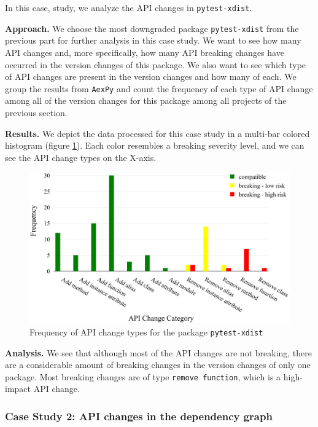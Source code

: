 \documentclass[conference]{IEEEtran}
\begin{document}
In this case, study, we analyze the API changes in \texttt{pytest-xdist}.

\textbf{Approach.} We choose the most downgraded package \texttt{pytest-xdist} from the previous part for further analysis in this case study. We want to see how many API changes and, more specifically, how many API breaking changes have occurred in the version changes of this package. We also want to see which type of API changes are present in the version changes and how many of each. We group the results from \texttt{AexPy} and count the frequency of each type of API change among all of the version changes for this package among all projects of the previous section.

\textbf{Results.} We depict the data processed for this case study in a multi-bar colored histogram (figure \ref{fig5}). Each color resembles a breaking severity level, and we can see the API change types on the X-axis. 

\begin{figure}[h]
\begin{minipage}[h]{\columnwidth}
  \includegraphics[width=\linewidth]{figs/xdist.png}
  \caption{Frequency of API change types for the package \texttt{pytest-xdist}}
  \label{fig5}
\end{minipage}\hfill
\end{figure}

\textbf{Analysis.} We see that although most of the API changes are not breaking, there are a considerable amount of breaking changes in the version changes of only one package. Most breaking changes are of type \texttt{remove function}, which is a high-impact API change. 

\subsubsection{Case Study 2: API changes in the dependency graph}
\end{document}
